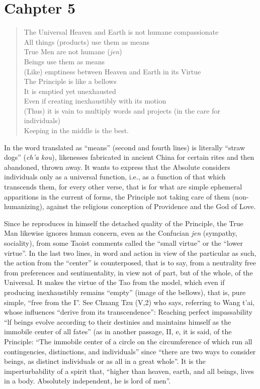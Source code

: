 \section{Cahpter 5}

\begin{quotex}
\begin{verse}
The Universal Heaven and Earth is not humane compassionate \\
All things (products) use them as means\\
True Men are not humane (\emph{jen})\\
Beings use them as means\\
(Like) emptiness between Heaven and Earth in its Virtue\\
The Principle is like a bellows\\
It is emptied yet unexhausted\\
Even if creating inexhaustibly with its motion\\
(Thus) it is vain to multiply words and projects (in the care for individuals)\\
Keeping in the middle is the best.
\end{verse}
\end{quotex}

In the word translated as ``means'' (second and fourth lines) is literally ``straw dogs'' (\emph{ch'a kou}), likenesses fabricated in ancient China for certain rites and then abandoned, thrown away. It wants to express that the Absolute considers individuals only as a universal function, i.e., as a function of that which transcends them, for every other verse, that is for what are simple ephemeral apparitions in the current of forms, the Principle not taking care of them (non-humanizing), against the religious conception of Providence and the God of Love.

Since he reproduces in himself the detached quality of the Principle, the True Man likewise ignores human concern, even as the Confucian \emph{jen} (sympathy, sociality), from some Taoist comments called the ``small virtue'' or the ``lower virtue''. In the last two lines, in word and action in view of the particular as such, the action from the ``center'' is counterposed, that is to say, from a neutrality free from preferences and sentimentality, in view not of part, but of the whole, of the Universal. It makes the virtue of the Tao from the model, which even if producing inexhaustibly remains ``empty'' (image of the bellows), that is, pure simple, ``free from the I''. See Chuang Tzu (V,2) who says, referring to Wang t'ai, whose influences ``derive from its transcendence'': Reaching perfect impassability ``lf beings evolve according to their destinies and maintains himself as the immobile center of all fates'' (as in another passage, II, e, it is said, of the Principle: ``The immobile center of a circle on the circumference of which run all contingencies, distinctions, and individuals'' since ``there are two ways to consider beings, as distinct individuals or as all in a great whole''. It is the imperturbability of a spirit that, ``higher than heaven, earth, and all beings, lives in a body. Absolutely independent, he is lord of men''.

